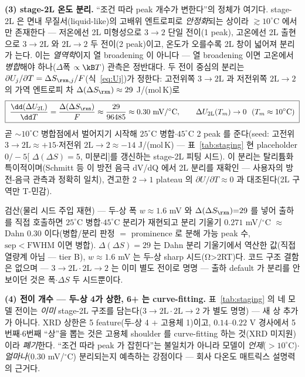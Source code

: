 \textbf{(3) stage-2L 온도 분리.} ``조건 따라 peak 개수가 변한다''의 정체가 여기다. stage-2L 은 면내 무질서(liquid-like)의
고배위 엔트로피로 \emph{안정화}되는 상이라 $\gtrsim\!10^\circ$C 에서만 존재한다\cite{dahn1991} --- 저온에선 2L 미형성으로
$3\!\to\!2$ 단일 전이(1 peak), 고온에선 2L 출현으로 $3\!\to\!2\mathrm L$ 와 $2\mathrm L\!\to\!2$ 두 전이(2 peak)이고,
온도가 오를수록 2L 창이 넓어져 분리가 는다. 이는 \emph{열역학}이지 열 broadening 이 아니다 --- 열 broadening 이면
고온에서 \emph{병합}해야 하나($\Delta$폭 $\propto\kB T$) 관측은 정반대다. 두 전이 중심의 분리는
$\partial U_j/\partial T=\Delta S_{\rxn,j}/F$(식~\eqref{eq:Uj})가 정한다: 고전위쪽 $3\!\to\!2\mathrm L$ 과 저전위쪽
$2\mathrm L\!\to\!2$ 의 가역 엔트로피 차 $\Delta(\Delta S_\rxn)\approx29$ J/(mol\,K)로
\begin{equation}
\boxed{\;\frac{\dd(\Delta U_{2\mathrm L})}{\dd T}=\frac{\Delta(\Delta S_\rxn)}{F}\approx\frac{29}{96485}\approx0.30\ \mathrm{mV/^\circ C},
\qquad \Delta U_{2\mathrm L}(T_m)\to0\ \ (T_m\approx10^\circ\mathrm C)\;}
\label{eq:gr2l-tsplit}
\end{equation}
곧 $\sim\!10^\circ$C 병합점에서 벌어지기 시작해 $25^\circ$C 병합$\cdot$$45^\circ$C 2 peak 를 준다(seed: 고전위
$3\!\to\!2\mathrm L\approx+15$$\cdot$저전위 $2\mathrm L\!\to\!2\approx-14$ J/(mol\,K) --- 표~\ref{tab:staging} 현
placeholder $0/{-}5$[ $\Delta(\Delta S){=}5$, 미분리]를 갱신하는 stage-2L 피팅 시드). 이 분리는 탈리튬화
특이적이며(Schmitt 등\cite{schmitt2022} 이 방전 음극 dV/dQ 에서 2L 분리를 재확인 --- 사용자의 방전-음극 관측과
정확히 일치), 견고한 $2\!\to\!1$ plateau 의 $\partial U/\partial T\!\approx\!0$\cite{reynier2003} 과 대조된다(2L
구역만 T-민감).
\begin{verifybox}
검산(물리 시드 주입 재현) --- 두-상 폭 $w\!\approx\!1.6$ mV 와 $\Delta(\Delta S_\rxn){=}29$ 를 넣어 출하
 를 직접 호출하면 $25^\circ$C 병합$\cdot$$45^\circ$C 분리가 재현되고 분리 기울기 $0.271$
mV/$^\circ$C $\approx$ Dahn $0.30$ 이다(병합/분리 판정 $=$ prominence 로 분해 가능 peak 수, $\mathrm{sep}<\mathrm{FWHM}$
이면 병합). $\Delta(\Delta S){=}29$ 는 Dahn 분리 기울기에서 역산한 값(직접 열량계 아님 --- tier B), $w\!\approx\!1.6$
mV 는 두-상 sharp 시드(Ω>2RT)다. 코드 구조 결함은 없으며 --- $3\!\to\!2\mathrm L\cdot2\mathrm L\!\to\!2$ 는 이미 별도
전이로 명명 --- 출하 default 가 분리를 안 보이던 것은 폭$\cdot$$\Delta S$ 두 시드뿐이다.
\end{verifybox}

\textbf{(4) 전이 개수 --- 두-상 4가 상한, 6+ 는 curve-fitting.} 표~\ref{tab:staging} 의 네 모델 전이는 \emph{이미}
stage-2L 구조를 담는다($3\!\to\!2\mathrm L\cdot2\mathrm L\!\to\!2$ 가 별도 명명) --- 새 상 추가가 아니다. XRD 상한은 5
feature(두-상 4 $+$ 고용체 1)이고, $0.14$--$0.22$ V 경사에서 5번째$\cdot$6번째 ``상''을 뽑는 것은 고용체 shoulder 를
curve-fitting 하는 것(XRD 미지원)이라 \emph{폐기}한다. ``조건 따라 peak 가 잡힌다''는 불일치가 아니라 모델이
\emph{언제}($>\!10^\circ$C)$\cdot$\emph{얼마나}($0.30$ mV/$^\circ$C) 분리되는지 예측하는 강점이다 --- 회사 다온도
매트릭스 설명력의 근거다.

